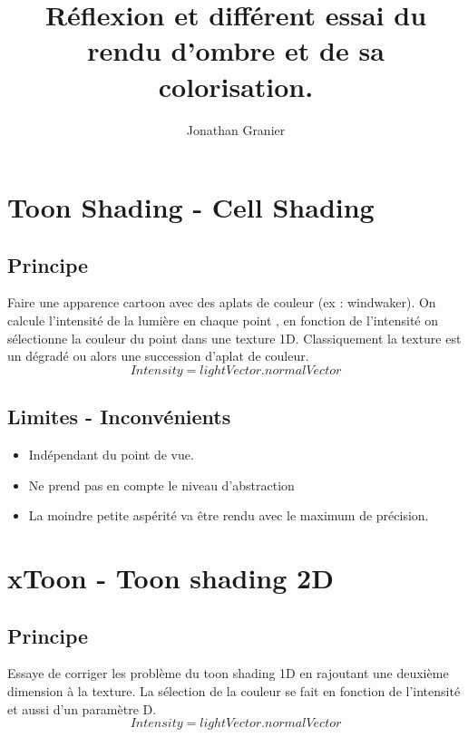 \documentclass[a4paper]{article}
\title{Réflexion et différent essai du rendu d'ombre et de sa colorisation.}
\author{Jonathan Granier}
\begin{document}
\maketitle



\section{Toon Shading - Cell Shading}
\subsection{Principe}
Faire une apparence cartoon avec des aplats de couleur (ex : windwaker). On calcule l'intensité de la lumière en chaque point , en fonction de l'intensité on sélectionne la couleur du point dans une texture 1D. Classiquement la texture est un dégradé ou alors une succession d’aplat de couleur.   
\[Intensity = lightVector . normalVector \]



\subsection{Limites - Inconvénients}
\begin{itemize}
\item Indépendant du point de vue.
\item Ne prend pas en compte le niveau d'abstraction
\item La moindre petite aspérité va être rendu avec le maximum de précision.  
\end{itemize}




\section{xToon - Toon shading 2D}
\subsection{Principe}
Essaye de corriger les problème du toon shading 1D en rajoutant une deuxième dimension à la texture. 
La sélection de la couleur se fait en fonction de l'intensité  et aussi d'un paramètre D. \\ 

\[Intensity = lightVector . normalVector \]
\end{document}
